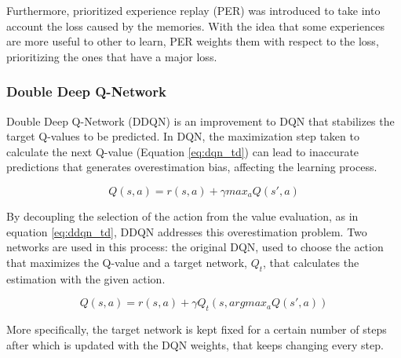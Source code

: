Furthermore, prioritized experience replay (PER) \citep{prioritized_memory} was introduced to take into account the loss caused by the memories. With the idea that some experiences are more useful to other to learn, PER weights them with respect to the loss, prioritizing the ones that have a major loss.


\subsubsection{Double Deep Q-Network}
Double Deep Q-Network (DDQN) \citep{DDQN} is an improvement to DQN that stabilizes the target Q-values to be predicted. In DQN, the maximization step taken to calculate the next Q-value (Equation \ref{eq:dqn_td}) can lead to inaccurate predictions that generates overestimation bias, affecting the learning process.

\begin{equation}\label{eq:dqn_td}
     Q(s,a) = r(s,a) + \gamma max_{a}Q(s',a)
\end{equation}

By decoupling the selection of the action from the value evaluation, as in equation \ref{eq:ddqn_td}, DDQN addresses this overestimation problem. Two networks are used in this process: the original DQN, used to choose the action that maximizes the Q-value and a target network, $Q_{t}$, that calculates the estimation with the given action.


\begin{equation}\label{eq:ddqn_td}
     Q(s,a) = r(s,a) + \gamma Q_{t}(s,argmax_{a}Q(s',a))
\end{equation}

More specifically, the target network is kept fixed for a certain number of steps after which is updated with the DQN weights, that keeps changing every step.

